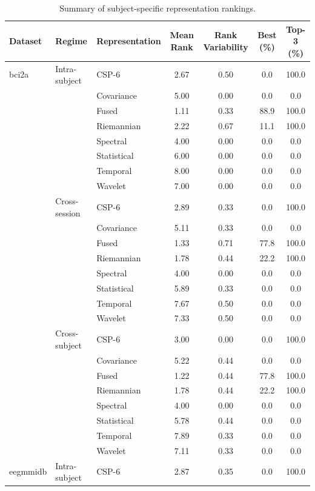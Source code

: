 \begin{table}[t]
\centering
\scriptsize
\caption{Summary of subject-specific representation rankings.}
\label{tab:subject_ranking_summary}
\begin{tabular}{lllcccc}
\toprule
\textbf{Dataset} & \textbf{Regime} & \textbf{Representation} &
\textbf{Mean Rank} & \textbf{Rank Variability} &
\textbf{Best (\%)} & \textbf{Top-3 (\%)} \\
\midrule
bci2a & Intra-subject & CSP-6 & 2.67 & 0.50 & 0.0 & 100.0 \\
 &  & Covariance & 5.00 & 0.00 & 0.0 & 0.0 \\
 &  & Fused & 1.11 & 0.33 & 88.9 & 100.0 \\
 &  & Riemannian & 2.22 & 0.67 & 11.1 & 100.0 \\
 &  & Spectral & 4.00 & 0.00 & 0.0 & 0.0 \\
 &  & Statistical & 6.00 & 0.00 & 0.0 & 0.0 \\
 &  & Temporal & 8.00 & 0.00 & 0.0 & 0.0 \\
 &  & Wavelet & 7.00 & 0.00 & 0.0 & 0.0 \\
\addlinespace[3pt]
 & Cross-session & CSP-6 & 2.89 & 0.33 & 0.0 & 100.0 \\
 &  & Covariance & 5.11 & 0.33 & 0.0 & 0.0 \\
 &  & Fused & 1.33 & 0.71 & 77.8 & 100.0 \\
 &  & Riemannian & 1.78 & 0.44 & 22.2 & 100.0 \\
 &  & Spectral & 4.00 & 0.00 & 0.0 & 0.0 \\
 &  & Statistical & 5.89 & 0.33 & 0.0 & 0.0 \\
 &  & Temporal & 7.67 & 0.50 & 0.0 & 0.0 \\
 &  & Wavelet & 7.33 & 0.50 & 0.0 & 0.0 \\
\addlinespace[3pt]
 & Cross-subject & CSP-6 & 3.00 & 0.00 & 0.0 & 100.0 \\
 &  & Covariance & 5.22 & 0.44 & 0.0 & 0.0 \\
 &  & Fused & 1.22 & 0.44 & 77.8 & 100.0 \\
 &  & Riemannian & 1.78 & 0.44 & 22.2 & 100.0 \\
 &  & Spectral & 4.00 & 0.00 & 0.0 & 0.0 \\
 &  & Statistical & 5.78 & 0.44 & 0.0 & 0.0 \\
 &  & Temporal & 7.89 & 0.33 & 0.0 & 0.0 \\
 &  & Wavelet & 7.11 & 0.33 & 0.0 & 0.0 \\
\midrule
eegmmidb & Intra-subject & CSP-6 & 2.87 & 0.35 & 0.0 & 100.0 \\

\end{tabular}
\end{table}
